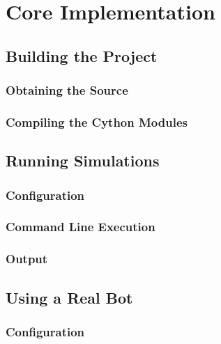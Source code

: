 \chapter{Core Implementation}


\section{Building the Project}

\subsection{Obtaining the Source}

\subsection{Compiling the Cython Modules}


\section{Running Simulations}

\subsection{Configuration}

\subsection{Command Line Execution}

\subsection{Output}


\section{Using a Real Bot}

\subsection{Configuration}

